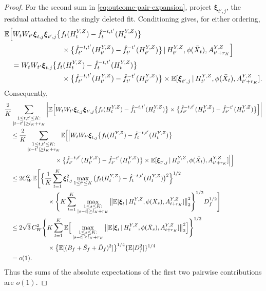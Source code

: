 \documentclass[12pt]{article}
\def\E{\mathbb{E}}
\newcommand\given{\,|\,}
\numberwithin{equation}{section}
\begin{document}
\begin{proof}
For the second sum in \eqref{eq:outcome-pair-expansion}, project
\(\boldsymbol\xi_{t',j}\), the residual attached to the singly
deleted fit. Conditioning gives, for either ordering,
\begin{align*}
&\E\Big[
W_tW_{t'}\boldsymbol\xi_{t,j}\boldsymbol\xi_{t',j}
\big\{f_t(H_t^{Y,Z})-\hat f_t^{-t,t'}(H_t^{Y,Z})\big\}\\
&\hspace{28mm}{}\times
\big\{\hat f_{t'}^{-t,t'}(H_{t'}^{Y,Z})
-\hat f_{t'}^{-t'}(H_{t'}^{Y,Z})\big\}
\given H_{t'}^{Y,Z},\phi(\bar X_t),A_{t'+r_K}^{Y,Z}
\Big]\\
&\quad=
W_tW_{t'}\boldsymbol\xi_{t,j}
\big\{f_t(H_t^{Y,Z})-\hat f_t^{-t,t'}(H_t^{Y,Z})\big\}\\
&\hspace{28mm}{}\times
\big\{\hat f_{t'}^{-t,t'}(H_{t'}^{Y,Z})
-\hat f_{t'}^{-t'}(H_{t'}^{Y,Z})\big\}\times
\E[\boldsymbol\xi_{t',j}\given
H_{t'}^{Y,Z},\phi(\bar X_t),A_{t'+r_K}^{Y,Z}].
\end{align*}
Consequently,
\begin{align}
&\frac2K\sum_{\substack{1\leq t,t'\leq K:\\
|t-t'|\geq l_K+r_K}}
\bigg|\E\Big[
W_tW_{t'}\boldsymbol\xi_{t,j}\boldsymbol\xi_{t',j}
\big\{f_t(H_t^{Y,Z})-\hat f_t^{-t,t'}(H_t^{Y,Z})\big\}
\times
\big\{\hat f_{t'}^{-t,t'}(H_{t'}^{Y,Z})
-\hat f_{t'}^{-t'}(H_{t'}^{Y,Z})\big\}
\Big]\bigg|
\notag\\
&\quad\leq\frac2K\sum_{\substack{1\leq t,t'\leq K:\\
|t-t'|\geq l_K+r_K}}
\E\Big[
\Big|W_tW_{t'}\boldsymbol\xi_{t,j}
\big\{f_t(H_t^{Y,Z})-\hat f_t^{-t,t'}(H_t^{Y,Z})\big\}
\notag\\*
&\hspace{28mm}{}\times
\big\{\hat f_{t'}^{-t,t'}(H_{t'}^{Y,Z})
-\hat f_{t'}^{-t'}(H_{t'}^{Y,Z})\big\}
\times
\E[\boldsymbol\xi_{t',j}\given
H_{t'}^{Y,Z},\phi(\bar X_t),A_{t'+r_K}^{Y,Z}]
\Big|
\Big]
\notag\\
&\quad\leq2C_W^2\E\Bigg[
\Big\{\frac1K\sum_{t=1}^K\boldsymbol\xi_{t,j}^2
\max_{1\leq t'\leq K}
\big(f_t(H_t^{Y,Z})-\hat f_t^{-t,t'}(H_t^{Y,Z})\big)^2
\Big\}^{1/2}
\notag\\*
&\hspace{24mm}{}\times
\Bigg\{K\sum_{t=1}^K
\max_{\substack{1\leq s\leq K:\\|s-t|\geq l_K+r_K}}
\big\|\E[\boldsymbol\xi_t\given
H_t^{Y,Z},\phi(\bar X_s),A_{t+r_K}^{Y,Z}]\big\|_2^2
\Bigg\}^{1/2}D_f^{1/2}
\Bigg]
\notag\\
&\quad\leq2\sqrt3\,C_W^2
\Bigg\{K\sum_{t=1}^K
\E\Big[
\max_{\substack{1\leq s\leq K:\\|s-t|\geq l_K+r_K}}
\big\|\E[\boldsymbol\xi_t\given
H_t^{Y,Z},\phi(\bar X_s),A_{t+r_K}^{Y,Z}]\big\|_2^2
\Big]\Bigg\}^{1/2}
\notag\\*
&\hspace{24mm}{}\times
\big\{\E[(B_f+\tilde S_f+\tilde D_f)^2]\big\}^{1/4}
\{\E[D_f^2]\}^{1/4}
\notag\\
&\quad=o(1).
\label{eq:outcome-mixed-bound}
\end{align}
Thus the sums of the absolute expectations of the first two
pairwise contributions are \(o(1)\).


\end{proof}
\end{document}
